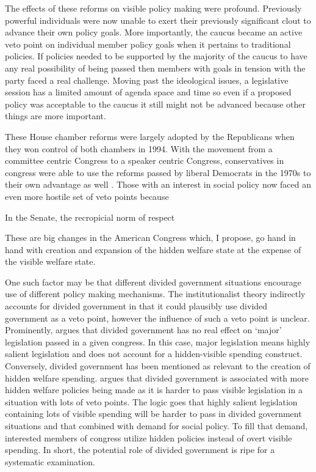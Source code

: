 \documentclass[12pt]{article}
\begin{document}
The effects of these reforms on visible policy making were profound. Previously powerful individuals were now unable to exert their previously significant clout to advance their own policy goals. More importantly, the caucus became an active veto point on individual member policy goals when it pertains to traditional policies. If policies needed to be supported by the majority of the caucus to have any real possibility of being passed then members with goals in tension with the party faced a real challenge. Moving past the ideological issues, a legislative session has a limited amount of agenda space and time so even if a proposed policy was acceptable to the caucus it still might not be advanced because other things are more important.

These House chamber reforms were largely adopted by the Republicans when they won control of both chambers in 1994. With the movement from a committee centric Congress to a speaker centric Congress, conservatives in congress were able to use the reforms passed by liberal Democrats in the 1970s to their own advantage as well \citep{zelizer2007}. Those with an interest in social policy now faced an even more hostile set of veto points because 

In the Senate, the recropicial norm of respect \citep{sinclair1986}

These are big changes in the American Congress which, I propose, go hand in hand with creation and expansion of the hidden welfare state at the expense of the visible welfare state.



One such factor may be that different divided government situations encourage use of different policy making mechanisms.  The institutionalist theory indirectly accounts for divided government in that it could plausibly use divided government as a veto point, however the influence of such a veto point is unclear. Prominently, \cite{mayhew1990} argues that divided government has no real effect on `major' legislation passed in a given congress. In this case, major legislation means highly salient legislation and does not account for a hidden-visible spending construct. Conversely, divided government has been mentioned as relevant to the creation of hidden welfare spending. \citet[Ch. 4]{howard2008} argues that divided government is associated with more hidden welfare policies being made as it is harder to pass visible legislation in a situation with lots of veto points. The logic goes that highly salient legislation containing lots of visible spending will be harder to pass in divided government situations and that combined with demand for social policy. To fill that demand, interested members of congress utilize hidden policies instead of overt visible spending. In short, the potential role of divided government is ripe for a systematic examination.
\end{document}
